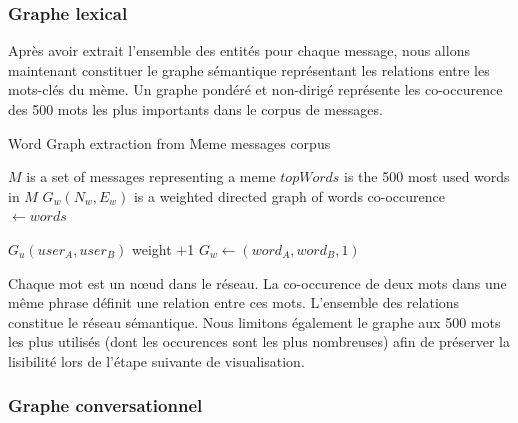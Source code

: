 \subsubsection{Graphe lexical}

    Après avoir extrait l'ensemble des entités pour chaque message, nous allons maintenant constituer le graphe sémantique représentant les relations entre les mots-clés du mème. Un graphe pondéré et non-dirigé représente les co-occurence des 500 mots les plus importants dans le corpus de messages.

    \begin{algorithm}[h]
        \caption{Word Graph extraction from Meme messages corpus}
        \label{algo:meme-graph}
        \begin{algorithmic}

            \Require $M$ is a set of messages representing a meme
            \State $topWords$ is the 500 most used words in $M$
            \State $G_w(N_w,E_w)$ is a weighted directed graph of words co-occurence
            \\
                    \State {}  $ \gets words$

                                \State $G_u(user_A,user_B)$ weight +1
                            \Else
                                \State $G_w \gets (word_A,word_B, 1)$
                            \EndIf
                        \EndFor
                    \EndIf
                \EndFor
            \EndFunction
        \end{algorithmic}
    \end{algorithm}

    Chaque mot est un nœud dans le réseau. La co-occurence de deux mots dans une même phrase définit une relation entre ces mots. L{\textquoteright}ensemble des relations constitue le réseau sémantique. Nous limitons également le graphe aux 500 mots les plus utilisés (dont les occurences sont les plus nombreuses) afin de préserver la lisibilité lors de l'étape suivante de visualisation.

\subsubsection[Graphe conversationnel]{Graphe conversationnel}

